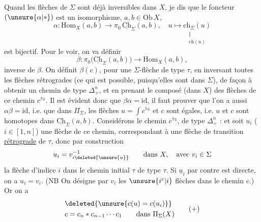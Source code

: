 Quand les flèches de $\Sigma$ sont déjà inversibles dans $X$, je dis que le foncteur $(\unsure{\alpha|*})$ est un isomorphisme,  $a,b\in\mathrm{Ob}\,X$,
\[\alpha:\mathrm{Hom}_X(a,b)\longrightarrow\pi_0\,\underline{\mathrm{Ch}}_\Sigma(a,b),\quad u\longmapsto\underset{\substack{\Vert\\\mathrm{ch}(u)}}{\mathrm{ch}_\Sigma(u)}\]
est bijectif. Pour le voir, on va définir
\[\beta:\pi_0\bigl(\underline{\mathrm{Ch}}_\Sigma(a,b)\bigr)\longrightarrow\mathrm{Hom}_X(a,b),\]
 inverse de $\beta$. On définit
$\beta(c)$, pour une $\Sigma$-flèche de type $\tau$,  en inversant toutes les flèches rétrogrades (ce qui est possible, puisqu'elles sont dans $\Sigma$), de façon à obtenir un chemin  de type $\Delta_+^n$, et en prenant le composé (dans $X$) des flèches de ce chemin $c^{\leftrightarrows}$.
Il est évident donc que $\beta\alpha=\mathrm{id}$, il faut prouver que l'on a aussi $\alpha\beta=\mathrm{id}$, i.e. que dans $\Pi_\Sigma$, les flèches $u=\int c^{\leftrightarrows}$ et $c$ sont égales, i.e. $u$ et $c$ sont homotopes dans $\underline{\mathrm{Ch}}_\Sigma(a,b)$.
Considérons le chemin $c^{\leftrightarrows}$, de type $\Delta_+^n$ :
et soit $u_i$ ($i\in[1,n]$) une flèche de ce chemin, correspondant à une flèche de transition  \uline{rétrograde} de $\tau$, donc par construction
\[u_i=v_{i\deleted{\unsure{u}}}^{-1}\qquad\text{dans } X,\quad\text{avec }v_i\in\Sigma\]
la flèche d'indice  $i$ dans le chemin initial $\tau$ de  type $\tau$.   Si $\underline{u}_i$ par contre est  directe, on a $u_i=v_i$.  (NB On désigne par $v_i$ les $\unsure{i^e|i}$ flèches dans le chemin $c$.) Or on a
\[\begin{aligned}
&\deleted{\unsure{c(u)=c(u_i)}}\\
&c=c_n*c_{n-1}\cdots c_1\qquad\text{dans }\Pi_\Sigma(X)
\end{aligned}\tag*{$(+)$}\]
